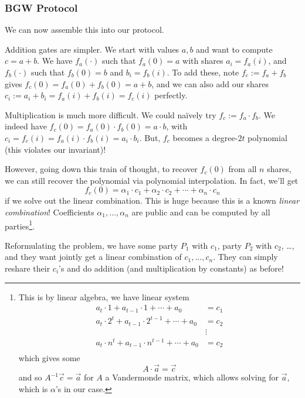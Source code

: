 \subsubsection{BGW Protocol}
We can now assemble this into our protocol.

Addition gates are simpler. We start with values $a, b$ and want to compute $c = a + b$. We have $f_a(\cdot)$ such that $f_a(0) = a$ with shares $a_i = f_a(i)$, and $f_b(\cdot)$ such that $f_b(0) = b$ and $b_i = f_b(i)$. To add these, note $f_c := f_a + f_b$ gives $f_c(0) = f_a(0) + f_b(0) = a + b$, and we can also add our shares $c_i := a_i + b_i = f_a(i) + f_b(i) = f_c(i)$ perfectly.


Multiplication is much more difficult. We could na\"ively try $f_c := f_a\cdot f_b$. We indeed have $f_c(0) = f_a(0)\cdot f_b(0) = a\cdot b$, with $c_i = f_c(i) = f_a(i)\cdot f_b(i) = a_i\cdot b_i$. But, $f_c$ becomes a degree-$2t$ polynomial (this violates our invariant)!

However, going down this train of thought, to recover $f_c(0)$ from all $n$ shares, we can still recover the polynomial via polynomial interpolation. In fact, we'll get
\[f_c(0) = \alpha_1\cdot c_1 + \alpha_2 \cdot c_2 + \cdots + \alpha_n \cdot c_n\]
if we solve out the linear combination. This is huge because this is a known \emph{linear combination}! Coefficients $\alpha_1, \dots, \alpha_n$ are public and can be computed by all parties\footnote{This is by linear algebra, we have linear system
    \begin{align*}
        a_t\cdot 1 + a_{t-1}\cdot 1 + \cdots + a_0         & = c_1  \\
        a_t\cdot 2^t + a_{t-1}\cdot 2^{t-1} + \cdots + a_0 & = c_2  \\
                                                           & \vdots \\
        a_t\cdot n^t + a_{t-1}\cdot n^{t-1} + \cdots + a_0 & = c_2  \\
    \end{align*}
    which gives some
    \[A\cdot \vec{a} = \vec{c}\]
    and so $A^{-1}\vec{c} = \vec{a}$ for $A$ a Vandermonde matrix, which allows solving for $\vec{a}$, which is $\alpha$'s in our case.
}.

Reformulating the problem, we have some party $P_1$ with $c_1$, party $P_2$ with $c_2$, \dots, and they want jointly get a linear combination of $c_1, \dots, c_n$. They can simply reshare their $c_i$'s and do addition (and multiplication by constants) as before!

